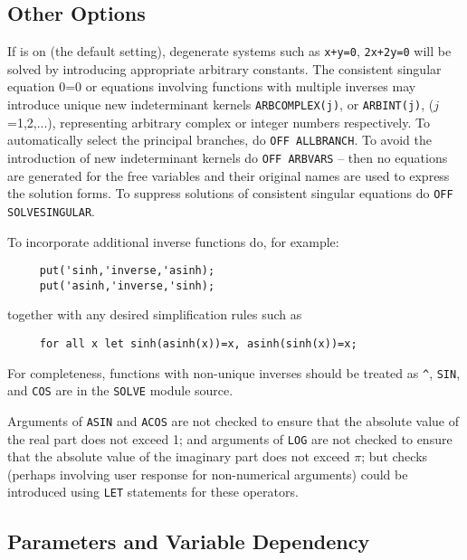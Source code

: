 \subsection{Other Options}
\hypertarget{switch:SOLVESINGULAR}{}
\hypertarget{switch:ALLBRANCH}{}
\hypertarget{switch:ARBVARS}{}
\hypertarget{operator:ARBCOMPLEX}{}
\hypertarget{operator:ARBINT}{}
If  is on (the default setting),
degenerate systems such as \texttt{x+y=0}, \texttt{2x+2y=0} will be solved by
introducing appropriate arbitrary constants.
The consistent singular equation 0=0 or equations involving functions with
multiple inverses may introduce unique new indeterminant kernels
\texttt{ARBCOMPLEX(j)}, or \texttt{ARBINT(j)}, ($j$=1,2,...),  %
representing arbitrary complex or integer numbers respectively.  To
automatically select the principal branches, do \texttt{OFF ALLBRANCH}.
 To avoid the introduction of new indeterminant kernels
do \texttt{OFF ARBVARS} -- then no equations are generated for the free
variables and their original names are used to express the solution forms.
To suppress solutions of consistent singular equations do
\texttt{OFF SOLVESINGULAR}.

To incorporate additional inverse functions do, for example:
\begin{verbatim}
     put('sinh,'inverse,'asinh);
     put('asinh,'inverse,'sinh);
\end{verbatim}
together with any desired simplification rules such as
\begin{verbatim}
     for all x let sinh(asinh(x))=x, asinh(sinh(x))=x;
\end{verbatim}
For completeness, functions with non-unique inverses should be treated as
\texttt{\textasciicircum}, \texttt{SIN}, and \texttt{COS} are in the \texttt{SOLVE}
module source.

Arguments of \texttt{ASIN} and \texttt{ACOS} are not checked to ensure that the
absolute value of the real part does not exceed 1; and arguments of
\texttt{LOG} are not checked to  ensure that the absolute value of the imaginary
part does not exceed $\pi$; but checks (perhaps involving user response
for non-numerical arguments) could be introduced using
\texttt{LET} statements for these operators.

\subsection{Parameters and Variable Dependency}

